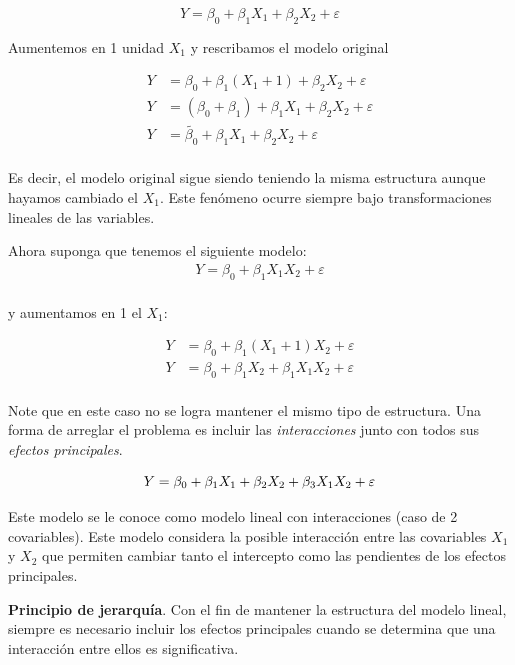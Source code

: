 \documentclass[
  12pt,
]{book}
\theoremstyle{definition}
\theoremstyle{definition}
\theoremstyle{definition}
\theoremstyle{definition}
\theoremstyle{remark}
\begin{document}
\begin{equation*}
Y = \beta_{0} + \beta_{1} X_{1} + \beta_{2} X_{2} + \varepsilon
\end{equation*}

Aumentemos en 1 unidad \(X_{1}\) y rescribamos el modelo original

\begin{align*}
Y &=  \beta_{0} + \beta_{1} (X_{1}+1) + \beta_{2} X_{2} + \varepsilon \\
Y &=  (\beta_{0} + \beta_{1}) + \beta_{1} X_{1} + \beta_{2} X_{2} + \varepsilon \\
Y &=  \tilde{\beta_{0}} + \beta_{1} X_{1} + \beta_{2} X_{2} + \varepsilon \\
\end{align*}

Es decir, el modelo original sigue siendo teniendo la misma estructura aunque hayamos cambiado el \(X_1\). Este fenómeno ocurre siempre bajo transformaciones lineales de las variables.

Ahora suponga que tenemos el siguiente modelo:
\begin{align*}
Y =  \beta_{0} + \beta_{1} X_{1} X_{2} +\varepsilon \\
\end{align*}

y aumentamos en 1 el \(X_1\):

\begin{align*}
Y &=  \beta_{0} + \beta_{1} (X_{1}+1) X_{2} +\varepsilon \\
Y &=  \beta_{0} + \beta_{1}X_{2} +  \beta_{1} X_{1} X_{2} +\varepsilon \\
\end{align*}

Note que en este caso no se logra mantener el mismo tipo de estructura. Una forma de arreglar el problema es incluir las \emph{interacciones} junto con todos sus \emph{efectos principales}.

\begin{equation*}
Y =  \beta_{0} + \beta_{1}X_{1} + \beta_{2} X_{2} +  \beta_{3} X_{1} X_{2} +\varepsilon \\
\end{equation*}

Este modelo se le conoce como modelo lineal con interacciones (caso de 2 covariables). Este modelo considera la posible interacción entre las covariables \(X_1\) y \(X_2\) que permiten cambiar tanto el intercepto como las pendientes de los efectos principales.

\textbf{Principio de jerarquía}. Con el fin de mantener la estructura del modelo lineal, siempre es necesario incluir los efectos principales cuando se determina que una interacción entre ellos es significativa.
\end{document}

